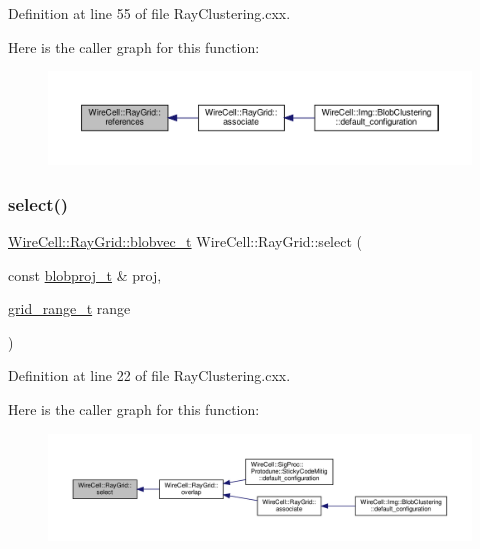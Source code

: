 Definition at line 55 of file Ray\+Clustering.\+cxx.

Here is the caller graph for this function\+:
\nopagebreak
\begin{figure}[H]
\begin{center}
\leavevmode
\includegraphics[width=350pt]{namespace_wire_cell_1_1_ray_grid_a1f3f06c1120d6202ac80459d28c4afa4_icgraph}
\end{center}
\end{figure}
\mbox{\label{namespace_wire_cell_1_1_ray_grid_ab4d35d6d20bc86bbc5403f8a50824ec6}} 
\subsubsection{\texorpdfstring{select()}{select()}}
{\footnotesize\ttfamily \hyperlink{namespace_wire_cell_1_1_ray_grid_a3154c64db4d07056418dfcd1afbf0531}{Wire\+Cell\+::\+Ray\+Grid\+::blobvec\+\_\+t} Wire\+Cell\+::\+Ray\+Grid\+::select (\begin{DoxyParamCaption}\item[{const \hyperlink{namespace_wire_cell_1_1_ray_grid_a2495e73e12fdf4e81ffef9d99f8a8e22}{blobproj\+\_\+t} \&}]{proj,  }\item[{\hyperlink{namespace_wire_cell_1_1_ray_grid_a4f0a195ceaa41bf0c9d13f0c81309633}{grid\+\_\+range\+\_\+t}}]{range }\end{DoxyParamCaption})}



Definition at line 22 of file Ray\+Clustering.\+cxx.

Here is the caller graph for this function\+:
\nopagebreak
\begin{figure}[H]
\begin{center}
\leavevmode
\includegraphics[width=350pt]{namespace_wire_cell_1_1_ray_grid_ab4d35d6d20bc86bbc5403f8a50824ec6_icgraph}
\end{center}
\end{figure}
\mbox{\label{namespace_wire_cell_1_1_ray_grid_a3bad40376b17bd165849797eb16c9ed2}} 

